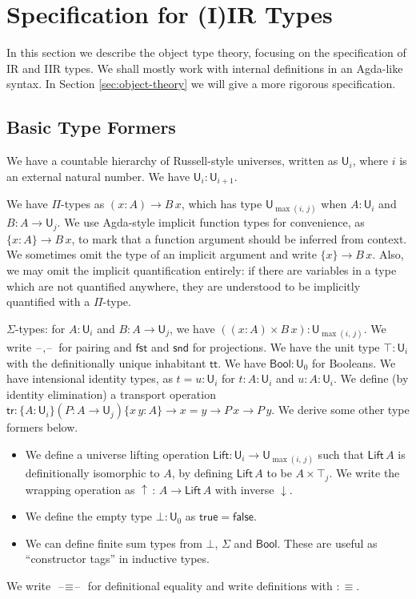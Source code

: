\documentclass[acmsmall,screen,review]{acmart}
\newcommand{\msf}[1]{{\mathsf{#1}}}
\newcommand{\U}{\msf{U}}
\newcommand{\Lift}{\msf{Lift}}
\newcommand{\lup}{\uparrow}
\newcommand{\ldown}{\downarrow}
\newcommand{\ttt}{\msf{tt}}
\newcommand{\blank}{{\mathord{\hspace{1pt}\text{--}\hspace{1pt}}}}
\newcommand{\tr}{\msf{tr}}
\newcommand{\fst}{\msf{fst}}
\newcommand{\snd}{\msf{snd}}
\newcommand{\Bool}{\msf{Bool}}
\newcommand{\true}{\msf{true}}
\newcommand{\false}{\msf{false}}
\begin{document}
\section{Specification for (I)IR Types}\label{sec:specification}

In this section we describe the object type theory, focusing on the specification of IR and IIR
types. We shall mostly work with internal definitions in an Agda-like syntax. In Section
\ref{sec:object-theory} we will give a more rigorous specification.

\subsection{Basic Type Formers}\label{sec:basic-type-formers}
We have a countable hierarchy of Russell-style universes, written as $\U_i$, where $i$ is an
external natural number. We have $\U_i : \U_{i + 1}$.

We have $\Pi$-types as $(x : A) \to B\,x$, which has type $\U_{\max(i,\,j)}$ when $A : \U_i$ and $B
: A \to \U_j$. We use Agda-style implicit function types for convenience, as $\{x : A\} \to B\,x$,
to mark that a function argument should be inferred from context. We sometimes omit the type of an
implicit argument and write $\{x\} \to B\,x$.  Also, we may omit the implicit quantification
entirely: if there are variables in a type which are not quantified anywhere, they are understood
to be implicitly quantified with a $\Pi$-type.

$\Sigma$-types: for $A : \U_i$ and $B : A \to \U_j$, we have $((x : A) \times B\,x) :
\U_{\max(i,\,j)}$.  We write $\blank,\blank$ for pairing and $\fst$ and $\snd$ for projections. We
have the unit type $\top : \U_i$ with the definitionally unique inhabitant $\ttt$. We have $\Bool : \U_0$ for
Booleans. We have intensional identity types, as $t = u : \U_i$ for $t : A : \U_i$ and $u : A : \U_i$. We define (by
identity elimination) a transport operation $\tr : \{A : \U_i\}(P : A \to \U_j)\{x\,y : A\} \to x =
y \to P\,x \to P\,y$. We derive some other type formers below.
\begin{itemize}
  \item We define a universe lifting operation $\Lift : \U_i \to \U_{\max(i,\,j)}$ such that
    $\Lift\,A$ is definitionally isomorphic to $A$, by defining $\Lift\,A$ to be $A \times \top_j$. We
    write the wrapping operation as $\lup\,:\,A \to \Lift\,A$ with inverse $\ldown$.
  \item We define the empty type $\bot : \U_0$ as $\true = \false$.
  \item We can define finite sum types from $\bot$, $\Sigma$ and $\Bool$. These are useful
    as ``constructor tags'' in inductive types.
\end{itemize}
We write $\blank\!\!\equiv\!\!\blank$ for definitional equality and write definitions with $:\equiv$.
\end{document}
